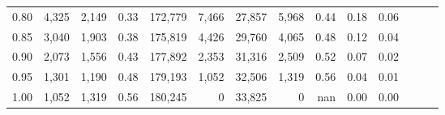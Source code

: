 \begin{tabular}{rrrrrrrrrrrrrr}
0.80 &   4,325 &  2,149 &  0.33 &  172,779 &    7,466 &  27,857 &   5,968 &  0.44 &  0.18 &      0.06 \\
0.85 &   3,040 &  1,903 &  0.38 &  175,819 &    4,426 &  29,760 &   4,065 &  0.48 &  0.12 &      0.04 \\
0.90 &   2,073 &  1,556 &  0.43 &  177,892 &    2,353 &  31,316 &   2,509 &  0.52 &  0.07 &      0.02 \\
0.95 &   1,301 &  1,190 &  0.48 &  179,193 &    1,052 &  32,506 &   1,319 &  0.56 &  0.04 &      0.01 \\
1.00 &   1,052 &  1,319 &  0.56 &  180,245 &        0 &  33,825 &       0 &   nan &  0.00 &      0.00 \\
\bottomrule
\end{tabular}
